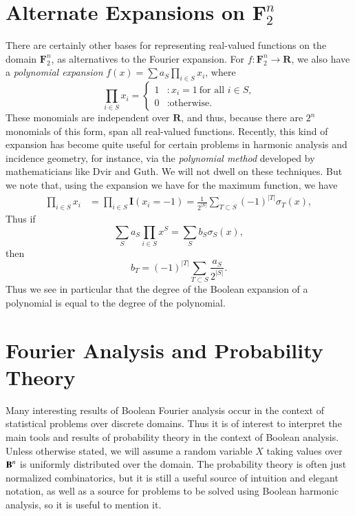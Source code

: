 \section{Alternate Expansions on $\mathbf{F}_2^n$}

There are certainly other bases for representing real-valued functions on the domain $\mathbf{F}_2^n$, as alternatives to the Fourier expansion. For $f: \mathbf{F}_2^n \to \mathbf{R}$, we also have a \emph{polynomial expansion} $f(x) = \sum a_S \prod_{i \in S} x_i$, where
%
\[ \prod_{i \in S} x_i = \begin{cases} 1 &: x_i = 1\ \text{for all $i \in S$,} \\ 0 &: \text{otherwise.} \end{cases} \]
%
These monomials are independent over $\mathbf{R}$, and thus, because there are $2^n$ monomials of this form, span all real-valued functions. Recently, this kind of expansion has become quite useful for certain problems in harmonic analysis and incidence geometry, for instance, via the \emph{polynomial method} developed by mathematicians like Dvir and Guth. We will not dwell on these techniques. But we note that, using the expansion we have for the maximum function, we have
%
\begin{align*}
    \prod_{i \in S} x_i &= \prod_{i \in S} \mathbf{I}(x_i = -1) = \frac{1}{2^{|S|}} \sum_{T \subset S} (-1)^{|T|} \sigma_T(x),
\end{align*}
%
Thus if
%
\[ \sum_S a_S \prod_{i \in S} x^S = \sum_S b_S \sigma_S(x), \]
%
then
%
\[ b_T = (-1)^{|T|} \sum_{T \subset S} \frac{a_S}{2^{|S|}}. \]
%
Thus we see in particular that the degree of the Boolean expansion of a polynomial is equal to the degree of the polynomial.

\section{Fourier Analysis and Probability Theory}

Many interesting results of Boolean Fourier analysis occur in the context of statistical problems over discrete domains. Thus it is of interest to interpret the main tools and results of probability theory in the context of Boolean analysis. Unless otherwise stated, we will assume a random variable $X$ taking values over $\operatorname{\mathbf{B}}^n$ is uniformly distributed over the domain. The probability theory is often just normalized combinatorics, but it is still a useful source of intuition and elegant notation, as well as a source for problems to be solved using Boolean harmonic analysis, so it is useful to mention it.

